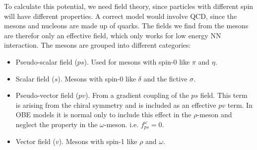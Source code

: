 To calculate this potential, we need field theory, since particles with different spin will have different
properties. A correct model would involve QCD, since the mesons and nucleons are made up of quarks.
The fields we find from the mesons are therefor only an effective field, which only works for low energy NN interaction.
The mesons are grouped into different categories:
\begin{itemize}
\item Pseudo-scalar field ($ps$). Used for mesons with spin-0 like $\pi$ and $\eta$.
\item Scalar field ($s$). Mesons with spin-0 like $\delta$ and the fictive $\sigma$.  
\item Pseudo-vector field ($pv$). From a gradient coupling of the $ps$ field. 
This term is arising from
the chiral symmetry and is included as an effective $pv$ term.
In OBE models it is normal only to
include this effect in the $\rho$-meson and neglect the property in the $\omega$-meson. i.e. $f^\omega_{ps}=0$.
\item Vector field ($v$). Mesons with spin-1 like $\rho$ and $\omega$.
\end{itemize}


